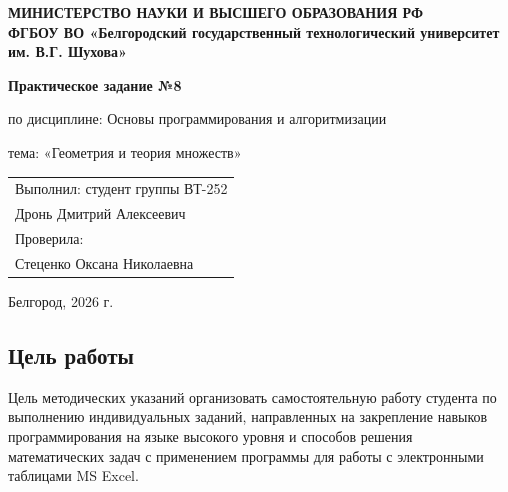 \documentclass[a4paper,12pt]{article}
\begin{document}
\begin{titlepage}
    \centering
    {\bfseries МИНИСТЕРСТВО НАУКИ И ВЫСШЕГО ОБРАЗОВАНИЯ РФ \\
    ФГБОУ ВО «Белгородский государственный технологический университет им. В.Г. Шухова»\par}
    
    \vfill
    
    {\bfseries\Large Практическое задание №8\par}
    \vspace{0.5cm}
    {\large по дисциплине: Основы программирования и алгоритмизации \par}
    {\large тема: «Геометрия и теория множеств» \par}
    
    \vfill
    
    \begin{flushright}
    \begin{tabular}{l}
        \large Выполнил: студент группы ВТ-252 \\
        \large Дронь Дмитрий Алексеевич \\
        \large Проверила: \\
        \large Стеценко Оксана Николаевна
    \end{tabular}
    \end{flushright}
    
    \vfill
    
    {\large Белгород, 2026 г. \par}
\end{titlepage}

\newpage
\begin{center}
\section*{Цель работы}
\end{center}
Цель методических указаний организовать самостоятельную работу студента по выполнению индивидуальных заданий, направленных на закрепление навыков программирования на языке высокого уровня и способов решения математических задач с применением программы для работы с электронными таблицами MS Excel.
\newpage
\end{document}
